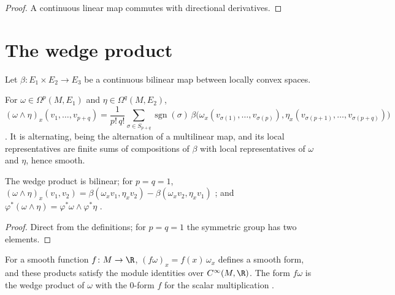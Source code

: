 \begin{proof}
  \leanok
  A continuous linear map commutes with directional derivatives.
\end{proof}

\section{The wedge product}

Let $\beta \colon E_1 \times E_2 \to E_3$ be a continuous bilinear map between locally convex
spaces.

\begin{definition}
  \label{def:wedge}
  \leanok
  For $\omega \in \Omega^p(M, E_1)$ and $\eta \in \Omega^q(M, E_2)$,
  \[
    (\omega \wedge \eta)_x(v_1, \dots, v_{p+q}) = \frac{1}{p!\,q!}
      \sum_{\sigma \in S_{p+q}} \operatorname{sgn}(\sigma)\,
      \beta\bigl(\omega_x(v_{\sigma(1)}, \dots, v_{\sigma(p)}),
        \eta_x(v_{\sigma(p+1)}, \dots, v_{\sigma(p+q)})\bigr)
  \]
  \cite[Definition~3.6.3]{GN26}. It is alternating, being the alternation of a multilinear map,
  and its local representatives are finite sums of compositions of $\beta$ with local
  representatives of $\omega$ and $\eta$, hence smooth.
\end{definition}

\begin{proposition}
  \label{prop:wedge-properties}
  \leanok
  The wedge product is bilinear; for $p = q = 1$,
  $(\omega \wedge \eta)_x(v_1, v_2) = \beta(\omega_x v_1, \eta_x v_2) - \beta(\omega_x v_2,
  \eta_x v_1)$ \cite[Definition~3.6.3]{GN26}; and $\varphi^*(\omega \wedge \eta) =
  \varphi^*\omega \wedge \varphi^*\eta$ \cite[(3.28)]{GN26}.
\end{proposition}

\begin{proof}
  \leanok
  Direct from the definitions; for $p = q = 1$ the symmetric group has two elements.
\end{proof}

\begin{proposition}
  \label{prop:smul-fun}
  \leanok
  For a smooth function $f \colon M \to \R$, $(f\omega)_x = f(x)\,\omega_x$ defines a smooth form,
  and these products satisfy the module identities over $C^\infty(M, \R)$. The form $f\omega$ is
  the wedge product of $\omega$ with the $0$-form $f$ for the scalar multiplication
  \cite[Remark~3.6.5]{GN26}.
\end{proposition}

